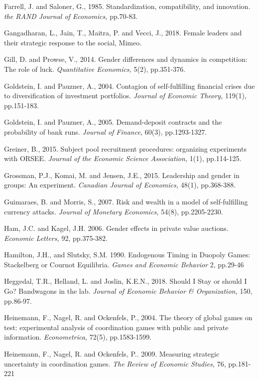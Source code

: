 \documentclass[11pt, letterpaper]{article}
\theoremstyle{plain}
\begin{document}
\begin{thebibliography}{10}
  Farrell, J. and Saloner, G., 1985. Standardization, compatibility, and innovation. \textit{the RAND Journal of Economics,} pp.70-83.

 Gangadharan, L., Jain, T., Maitra, P. and Vecci, J., 2018. Female leaders and their strategic response to the social, Mimeo.

  Gill, D. and Prowse, V., 2014. Gender differences and dynamics in competition: The role of luck. \textit{Quantitative Economics,} 5(2), pp.351-376.

\bibitem{} Goldstein, I. and Pauzner, A., 2004. Contagion of self-fulfilling financial crises due to diversification of investment portfolios. \textit{Journal of Economic Theory,} 119(1), pp.151-183.

\bibitem{} Goldstein, I. and Pauzner, A., 2005. Demand-deposit contracts and the probability of bank runs. \textit{Journal of Finance,} 60(3), pp.1293-1327.

\bibitem{} Greiner, B., 2015. Subject pool recruitment procedures: organizing experiments with ORSEE. \textit{Journal of the Economic Science Association,} 1(1), pp.114-125.

\bibitem{} Grossman, P.J., Komai, M. and Jensen, J.E., 2015. Leadership and gender in groups: An experiment. \textit{Canadian Journal of Economics,} 48(1), pp.368-388.

\bibitem{}  Guimaraes, B. and Morris, S., 2007. Risk and wealth in a model of self-fulfilling currency attacks. \textit{Journal of Monetary Economics,} 54(8), pp.2205-2230.

\bibitem{}  Ham, J.C. and Kagel, J.H. 2006. Gender effects in private value auctions. \textit{Economic Letters,} 92, pp.375-382.

\bibitem{} Hamilton, J.H., and Slutsky, S.M. 1990. Endogenous Timing in Duopoly Games: Stackelberg or Cournot Equilibria. \textit{Games and Economic Behavior} 2, pp.29-46

\bibitem{} Heggedal, T.R., Helland, L. and Joslin, K.E.N., 2018. Should I Stay or should I Go? Bandwagons in the lab. \textit{Journal of Economic Behavior \& Organization,} 150, pp.86-97.

\bibitem{}Heinemann, F., Nagel, R. and Ockenfels, P., 2004. The theory of global games on test: experimental analysis of coordination games with public and private information. \textit{Econometrica, } 72(5), pp.1583-1599.

\bibitem{} Heinemann, F., Nagel, R. and Ockenfels, P.. 2009. Measuring strategic uncertainty in coordination games. \textit{The Review of Economic Studies,}  76, pp.181-221


\end{thebibliography}
\end{document}
